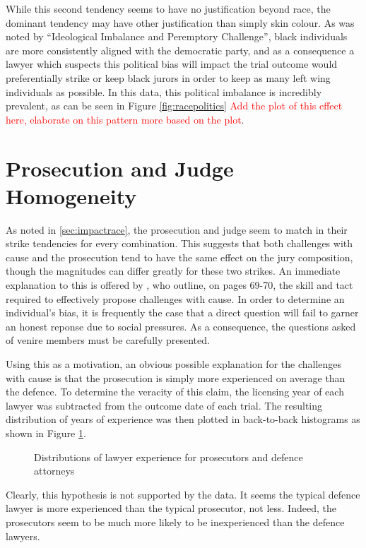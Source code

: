 While this second tendency seems to have no justification beyond race, the dominant tendency may have other justification than
simply skin colour. As was noted by ``Ideological Imbalance and Peremptory Challenge'', black individuals are more consistently
aligned with the democratic party, and as a consequence a lawyer which suspects this political bias will impact the trial outcome
would preferentially strike or keep black jurors in order to keep as many left wing individuals as possible. In this data, this
political imbalance is incredibly prevalent, as can be seen in Figure \ref{fig:racepolitics} \textcolor{red}{Add the plot of this
  effect here, elaborate on this pattern more based on the plot}.

\section{Prosecution and Judge Homogeneity} \label{sec:causepro}

As noted in \ref{sec:impactrace}, the prosecution and judge seem to match in their strike tendencies for every combination. This
suggests that both challenges with cause and the prosecution tend to have the same effect on the jury composition, though the
magnitudes can differ greatly for these two strikes. An immediate explanation to this is offered by \cite{hansvidjudging}, who
outline, on pages 69-70, the skill and tact required to effectively propose challenges with cause. In order to determine an
individual's bias, it is frequently the case that a direct question will fail to garner an honest reponse due to social pressures.
As a consequence, the questions asked of venire members must be carefully presented.

Using this as a motivation, an obvious possible explanation for the challenges with cause is that the prosecution is simply more
experienced on average than the defence. To determine the veracity of this claim, the licensing year of each lawyer was subtracted
from the outcome date of each trial. The resulting distribution of years of experience was then plotted in back-to-back histograms
as shown in Figure \ref{fig:lawyerexp}.

\begin{figure}[h!]
  \caption[Lawyer Experience (Sunshine)]
  {Distributions of lawyer experience for prosecutors and defence attorneys}
  \label{fig:lawyerexp}
\end{figure}

Clearly, this hypothesis is not supported by the data. It seems the typical defence lawyer is more experienced than the typical
prosecutor, not less. Indeed, the prosecutors seem to be much more likely to be inexperienced than the defence lawyers.
  
